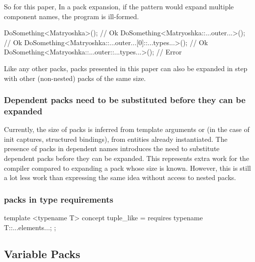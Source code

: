 \documentclass{wg21}
\begin{document}
So for this paper, In a pack expansion, if the pattern would expand multiple component names, the program is ill-formed.

\begin{colorblock}
DoSomething<Matryoshka>(); // Ok
DoSomething<Matryoshka::...outer...>(); // Ok
DoSomething<Matryoshka::...outer...[0]::...types...>(); // Ok
DoSomething<Matryoshka::...outer::...types...>(); // Error
\end{colorblock}

Like any other packs, packs presented in this paper can also be expanded in step with other (non-nested) packs of the same size.

\subsubsection{Dependent packs need to be substituted before they can be expanded}


Currently, the size of packs is inferred from template arguments or (in the case of init captures, structured bindings),
from entities already instantiated.
The presence of packs in dependent names introduces the need to substitute dependent packs before they can be expanded.
This represents extra work for the compiler compared to expanding a pack whose size is known.
However, this is still a lot less work than expressing the same idea without access to nested packs.

\subsubsection{packs in type requirements}

\begin{colorblock}

template <typename T>
concept tuple_like = requires {
    typename T::...elements...;
};

\end{colorblock}

\subsection{Variable Packs}
\end{document}
